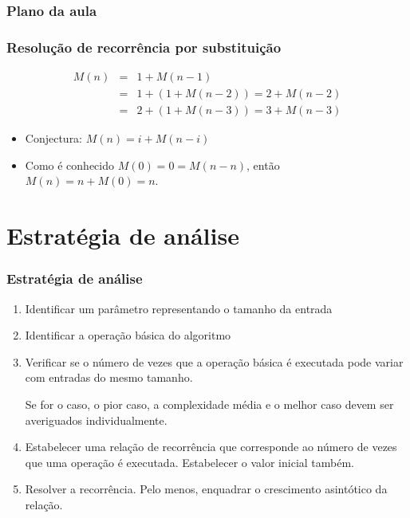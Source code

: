 \documentclass[handout]{beamer}
\begin{document}
\begin{frame}
  \frametitle{Plano da aula}
  \tableofcontents
\end{frame}

\begin{frame}
  \frametitle{Resolução de recorrência por substituição}

\begin{eqnarray*}
M(n) & = & 1 + M(n-1) \\
& = & 1 + (1 + M(n-2)) = 2 + M(n-2) \\
& = & 2 + (1 + M(n-3)) = 3 + M(n-3) 
\end{eqnarray*}
\begin{itemize}
\item Conjectura: $M(n) = i + M(n-i)$
\item Como é conhecido $M(0) = 0 = M(n-n)$, então $M(n) = n + M(0) = n$.
\end{itemize}
\end{frame}

\section{Estratégia de análise}

\begin{frame}
\frametitle{Estratégia de análise}
\begin{enumerate}
\item Identificar um parâmetro representando o tamanho da entrada
\item Identificar a operação básica do algoritmo
\item Verificar se o número de vezes que a operação básica é executada pode
  variar com entradas do mesmo tamanho.

  Se for o caso, o pior caso, a complexidade média e o melhor caso devem ser
  averiguados individualmente.
\item Estabelecer uma relação de recorrência que corresponde ao número de vezes que uma operação é executada. Estabelecer o valor inicial também.

\item Resolver a recorrência. Pelo menos, enquadrar o crescimento asintótico da
  relação.
\end{enumerate}
\end{frame}
\end{document}
